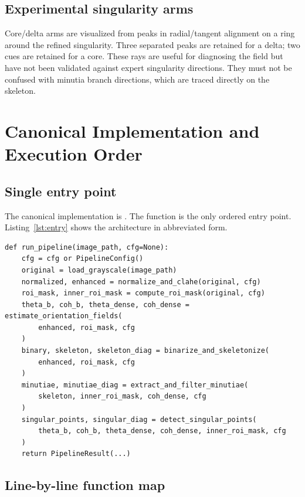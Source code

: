 \documentclass[11pt]{article}
\begin{document}
\subsection{Experimental singularity arms}

Core/delta arms are visualized from peaks in radial/tangent alignment on a ring around the refined singularity. Three separated peaks are retained for a delta; two cues are retained for a core. These rays are useful for diagnosing the field but have not been validated against expert singularity directions. They must not be confused with minutia branch directions, which are traced directly on the skeleton.

\section{Canonical Implementation and Execution Order}

\subsection{Single entry point}

The canonical implementation is . The function  is the only ordered entry point. Listing~\ref{lst:entry} shows the architecture in abbreviated form.

\begin{lstlisting}[caption={Canonical orchestration. The complete source is included in the repository.},label={lst:entry}]
def run_pipeline(image_path, cfg=None):
    cfg = cfg or PipelineConfig()
    original = load_grayscale(image_path)
    normalized, enhanced = normalize_and_clahe(original, cfg)
    roi_mask, inner_roi_mask = compute_roi_mask(original, cfg)
    theta_b, coh_b, theta_dense, coh_dense = estimate_orientation_fields(
        enhanced, roi_mask, cfg
    )
    binary, skeleton, skeleton_diag = binarize_and_skeletonize(
        enhanced, roi_mask, cfg
    )
    minutiae, minutiae_diag = extract_and_filter_minutiae(
        skeleton, inner_roi_mask, coh_dense, cfg
    )
    singular_points, singular_diag = detect_singular_points(
        theta_b, coh_b, theta_dense, coh_dense, inner_roi_mask, cfg
    )
    return PipelineResult(...)
\end{lstlisting}

\subsection{Line-by-line function map}
\end{document}
